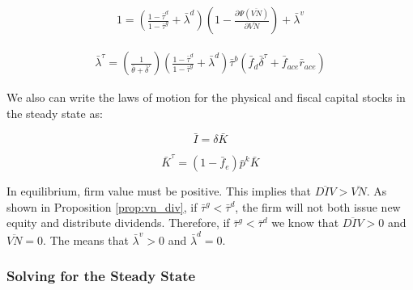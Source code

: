  \begin{equation}
\label{eqn:foc_vn_tax_ss}
\begin{split}
 1 = \left(\frac{1-\bar{\tau}^{d}}{1-\bar{\tau}^{g}} + \bar{\lambda}^{d}\right)\left(1-\frac{\partial \Psi(\overline{VN})}{\partial \overline{VN}}\right) + \bar{\lambda}^{v}
 \end{split}
\end{equation}

 \begin{equation}
\label{eqn:foc_ktau_tax_ss}
\begin{split}
 \bar{\lambda}^{\tau} =  \left(\frac{1}{\bar{\theta}+\bar{\delta}^{\tau}}\right)\left(\frac{1-\bar{\tau}^{d}}{1-\bar{\tau}^{g}} + \bar{\lambda}^{d} \right)\bar{\tau}^{b}\left(\bar{f}_{d}\bar{\delta}^{\tau}+\bar{f}_{ace}\bar{r}_{ace}\right)
 \end{split}
\end{equation}


We also can write the laws of motion for the physical and fiscal capital stocks in the steady state as:

\begin{equation}
\label{eqn:lom_k_ss}
\bar{I}=\delta\bar{K}
\end{equation}

\begin{equation}
\label{eqn:lom_ktau_ss}
\bar{K}^{\tau}=(1-\bar{f}_{e})\bar{p}^{k}\bar{K}
\end{equation}

In equilibrium, firm value must be positive.  This implies that $\overline{DIV}>\overline{VN}$.  As shown in Proposition \ref{prop:vn_div}, if $\bar{\tau}^{g}<\bar{\tau}^{d}$, the firm will not both issue new equity and distribute dividends.  Therefore, if $\bar{\tau}^{g}<\bar{\tau}^{d}$ we know that $\overline{DIV}>0$ and $\overline{VN}=0$.  The means that $\bar{\lambda}^{v}>0$ and $\bar{\lambda}^{d}=0$.  

\subsubsection{Solving for the Steady State}

